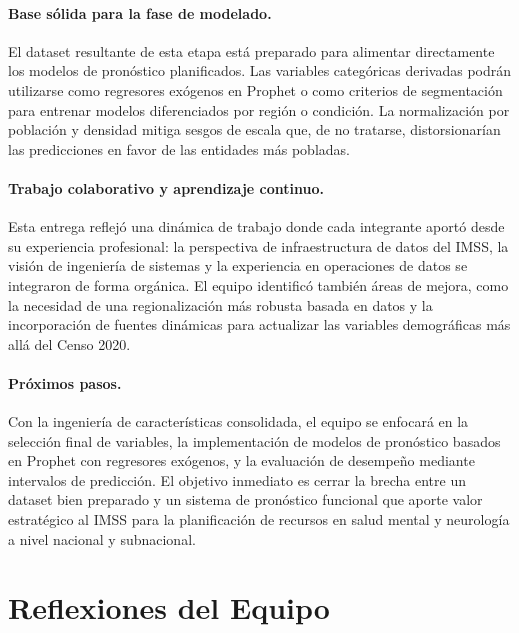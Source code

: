 \documentclass[12pt,letterpaper]{article}
\begin{document}
\paragraph{Base sólida para la fase de modelado.}
El dataset resultante de esta etapa está preparado para alimentar directamente los modelos de pronóstico planificados. Las variables categóricas derivadas podrán utilizarse como regresores exógenos en Prophet o como criterios de segmentación para entrenar modelos diferenciados por región o condición. La normalización por población y densidad mitiga sesgos de escala que, de no tratarse, distorsionarían las predicciones en favor de las entidades más pobladas.

\paragraph{Trabajo colaborativo y aprendizaje continuo.}
Esta entrega reflejó una dinámica de trabajo donde cada integrante aportó desde su experiencia profesional: la perspectiva de infraestructura de datos del IMSS, la visión de ingeniería de sistemas y la experiencia en operaciones de datos se integraron de forma orgánica. El equipo identificó también áreas de mejora, como la necesidad de una regionalización más robusta basada en datos y la incorporación de fuentes dinámicas para actualizar las variables demográficas más allá del Censo 2020.

\paragraph{Próximos pasos.}
Con la ingeniería de características consolidada, el equipo se enfocará en la selección final de variables, la implementación de modelos de pronóstico basados en Prophet con regresores exógenos, y la evaluación de desempeño mediante intervalos de predicción. El objetivo inmediato es cerrar la brecha entre un dataset bien preparado y un sistema de pronóstico funcional que aporte valor estratégico al IMSS para la planificación de recursos en salud mental y neurología a nivel nacional y subnacional.

\newpage

\section*{Reflexiones del Equipo}
\end{document}
